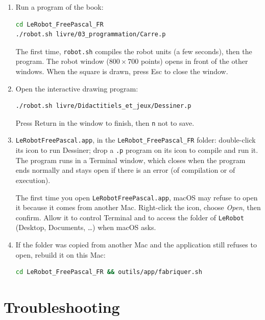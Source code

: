\documentclass[11pt,a4paper]{article}
\newcommand{\kbd}[1]{\texttt{#1}}
\begin{document}
\begin{enumerate}
\item Run a program of the book:
\begin{lstlisting}[language=bash]
cd LeRobot_FreePascal_FR
./robot.sh livre/03_programmation/Carre.p
\end{lstlisting}
  The first time, \kbd{robot.sh} compiles the robot units (a few seconds),
  then the program. The robot window ($800 \times 700$ points) opens in
  front of the other windows. When the square is drawn, press Esc to close
  the window.
\item Open the interactive drawing program:
\begin{lstlisting}[language=bash]
./robot.sh livre/Didactitiels_et_jeux/Dessiner.p
\end{lstlisting}
  Press Return in the window to finish, then \kbd{n} not to save.
\item \kbd{LeRobotFreePascal.app}, in the \kbd{LeRobot\_FreePascal\_FR}
  folder: double-click its icon to run Dessiner; drop a \kbd{.p} program on
  its icon to compile and run it. The program runs in a Terminal window,
  which closes when the program ends normally and stays open if there is
  an error (of compilation or of execution).

  The first time you open \kbd{LeRobotFreePascal.app}, macOS may refuse to
  open it because it comes from another Mac. Right-click the icon, choose
  \emph{Open}, then confirm. Allow it to control Terminal and to access the
  folder of \kbd{LeRobot} (Desktop, Documents, \dots) when macOS asks.
\item If the folder was copied from another Mac and the application still
  refuses to open, rebuild it on this Mac:
\begin{lstlisting}[language=bash]
cd LeRobot_FreePascal_FR && outils/app/fabriquer.sh
\end{lstlisting}
\end{enumerate}

\section{Troubleshooting}
\end{document}
